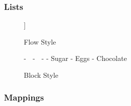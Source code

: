 \subsubsection{Lists}

\begin{figure}[H]
  \begin{minipage}[t]{0.48\textwidth}
    \vspace{0pt}
    \begin{bchart}[max=9, width=0.85\textwidth]
    \end{bchart}
  \end{minipage}
  \begin{minipage}[t]{0.48\textwidth}
    \vspace{0pt}
    \begin{yamlcode}
      [🍎, 🍊,
        [Sugar, Eggs, Chocolate]
      ]
    \end{yamlcode}
  \end{minipage}
  \caption{Flow Style}
\end{figure}

\begin{figure}[H]
  \begin{minipage}[t]{0.48\textwidth}
    \vspace{0pt}
    \begin{bchart}[max=9, width=0.85\textwidth]
    \end{bchart}
  \end{minipage}
  \begin{minipage}[t]{0.48\textwidth}
    \vspace{0pt}
    \begin{yamlcode}
      - 🍎
      - 🍊
      - - Sugar
        - Eggs
        - Chocolate
    \end{yamlcode}
  \end{minipage}
  \caption{Block Style}
\end{figure}

\subsubsection{Mappings}

